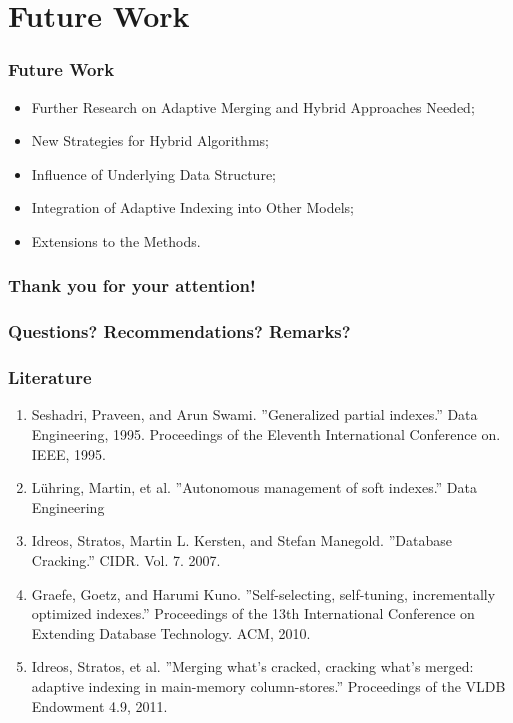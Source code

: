 \documentclass{beamer}
\begin{document}
\section{Future Work}
\begin{frame}
\frametitle{Future Work}
\begin{itemize}
\item{Further Research on Adaptive Merging and Hybrid Approaches Needed;}
\item{New Strategies for Hybrid Algorithms;}
\item{Influence of Underlying Data Structure;}
\item{Integration of Adaptive Indexing into Other Models;}
\item{Extensions to the Methods.}
\end{itemize}
\end{frame}

\begin{frame}
\frametitle{Thank you for your attention!}
\end{frame}

\begin{frame}
\frametitle{Questions? Recommendations? Remarks?}
\end{frame}

\begin{frame}
\frametitle{Literature}
\begin{enumerate}
\item{Seshadri, Praveen, and Arun Swami. ”Generalized partial indexes.” Data Engineering, 1995. Proceedings of the Eleventh International Conference on. IEEE, 1995.}
\item{L\"uhring, Martin, et al. ”Autonomous management of soft indexes.” Data Engineering}
\item{Idreos, Stratos, Martin L. Kersten, and Stefan Manegold. ”Database
Cracking.” CIDR. Vol. 7. 2007.}
\item{Graefe, Goetz, and Harumi Kuno. ”Self-selecting, self-tuning, incrementally optimized indexes.” Proceedings of the 13th International Conference on Extending Database Technology. ACM, 2010.}
\item{Idreos, Stratos, et al. ”Merging what’s cracked, cracking what’s merged: adaptive indexing in main-memory column-stores.” Proceedings of the VLDB Endowment 4.9, 2011.}
\end{enumerate}
\end{frame}
\end{document}
